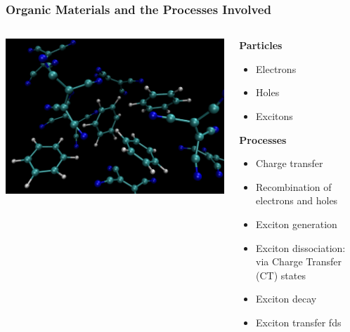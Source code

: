 \documentclass[t,aspectratio=169, 8pt]{beamer}
\begin{document}
\begin{frame}
	\frametitle{Organic Materials and the Processes Involved}
	\begin{columns}[c]
		\begin{column}{0.6\textwidth}
			\includegraphics[height=0.7\textheight]{material.png}
		\end{column}
		\begin{column}{0.36\textwidth}
			\textbf{Particles}
			\begin{itemize}
				\item Electrons
				\item Holes
				\item Excitons
			\end{itemize}
			\medskip
			\textbf{Processes}
			\begin{itemize}
				\item Charge transfer
				\item Recombination of electrons and holes
				\item Exciton generation
				\item Exciton dissociation: via Charge Transfer (CT) states
				\item Exciton decay
				\item Exciton transfer fds
			\end{itemize}
		\end{column}
	\end{columns}
\end{frame}
\end{document}
